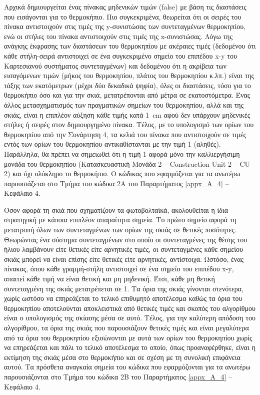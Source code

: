 \documentclass[12pt, a4paper]{report} %
\newcommand{\english}{\foreignlanguage{english}}
\begin{document}
Αρχικά δημιουργείται ένας πίνακας μηδενικών τιμών (\english{false}) με βάση τις διαστάσεις που εισάγονται για το θερμοκήπιο. Πιο 
συγκεκριμένα, θεωρείται ότι οι σειρές του πίνακα αντιστοιχούν στις τιμές της \english{y}-συνιστώσας των συντεταγμένων θερμοκηπίου, 
ενώ οι στήλες του πίνακα αντιστοιχούν στις τιμές της \english{x}-συνιστώσας. Λόγω της ανάγκης έκφρασης των διαστάσεων του 
θερμοκηπίου με ακέραιες τιμές (δεδομένου ότι κάθε στήλη-σειρά αντιστοιχεί σε ένα συγκεκριμένο σημείο του επιπέδου \english{x-y} 
του Καρτεσιανού συστήματος συντεταγμένων) και δεδομένου ότι η ακρίβεια των εισαγόμενων τιμών (μήκος του θερμοκηπίου, πλάτος του 
θερμοκηπίου κ.λπ.) είναι της τάξης των εκατόμετρων (μέχρι δύο δεκαδικά ψηφία), όλες οι διαστάσεις, τόσο για το θερμοκήπιο όσο και 
για την σκιά, μετατρέπονται από μέτρα σε εκατοστόμετρα. Ένας άλλος μετασχηματισμός των πραγματικών σημείων του θερμοκηπίου, αλλά 
και της σκιάς, είναι η επιπλέον αύξηση κάθε τιμής κατά \SI{1}{\centi\meter} αφού δεν υπάρχουν μηδενικές στήλες ή σειρές στον 
δημιουργημένο πίνακα. Τέλος, με το υπολογισμό των ορίων του θερμοκηπίου από την Συνάρτηση 4, τα κελιά του πίνακα που αντιστοιχούν 
σε τιμές εντός των ορίων του θερμοκηπίου αντικαθίστανται με την τιμή 1 (αληθές). Παράλληλα, θα πρέπει να σημειωθεί ότι η τιμή 1 
αφορά μόνο την καλλιεργήσιμη μονάδα του θερμοκηπίου (Κατασκευαστική Μονάδα 2 – \english{Construction Unit 2 – CU 2}) και όχι 
ολόκληρο το θερμοκήπιο. Ο κώδικας που εφαρμόζεται για τα ανωτέρω παρουσιάζεται στο Τμήμα του κώδικα 2Α του Παραρτήματος 
\ref{appx_A_4} – Κεφάλαιο 4.

Όσον αφορά τη σκιά που σχηματίζουν τα φωτοβολταϊκά, ακολουθείται η ίδια στρατηγική με κάποια επιπλέον απαραίτητα σημεία. Το πρώτο 
σημείο αφορά τη μετατροπή όλων των συντεταγμένων των ορίων της σκιάς σε θετικές ποσότητες. Θεωρώντας ένα σύστημα συντεταγμένων 
στο οποίο οι συντεταγμένες της θέσης του ήλιου λαμβάνουν είτε θετικές είτε αρνητικές τιμές, οι συντεταγμένες κάθε σημείου σκιάς 
μπορεί να είναι επίσης είτε θετικές είτε αρνητικές, αντίστοιχα. Ωστόσο, ένας πίνακας, όπου κάθε γραμμή-στήλη αντιστοιχεί σε ένα 
σημείο του επιπέδου \english{x-y}, απαιτεί κάθε τιμή να είναι θετική και μη μηδενική. Έτσι, κάθε μη θετική συντεταγμένη της σκιάς 
μετατρέπεται σε 1. Τα όρια της σκιάς γίνονται στενότερα, χωρίς ωστόσο να επηρεάζεται το τελικό επιθυμητό αποτέλεσμα καθώς τα όρια 
του θερμοκηπίου αποτελούνται αποκλειστικά από θετικές τιμές και σκοπός του αλγορίθμου είναι ο υπολογισμός της σκίασης μέσα σε αυτό. 
Τέλος, για την καλύτερη απόδοση του αλγορίθμου, τα όρια της σκιάς που παρουσιάζουν θετικές τιμές και είναι μεγαλύτερα από τα όρια 
του θερμοκηπίου εξισώνονται με αυτά των ορίων του θερμοκηπίου χωρίς να επηρεάζεται και πάλι το τελικό αποτέλεσμα το οποίο, όπως 
προαναφέρθηκε, είναι η εκτίμηση της σκιάς μέσα στο θερμοκήπιο και σε σχέση με τη συνολική επιφάνεια αυτού. Τα πρόσθετα αναγκαία 
σημεία του κώδικα που εφαρμόζονται για τα ανωτέρω παρουσιάζονται στο Τμήμα του κώδικα 2Β του Παραρτήματος 
\ref{appx_A_4} – Κεφάλαιο 4.
\end{document}
